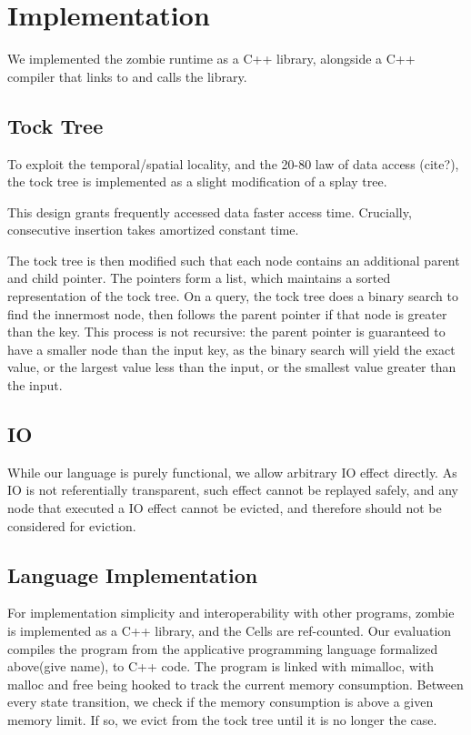 \section{Implementation}
We implemented the zombie runtime as a C++ library, alongside a C++ compiler that links to and calls the library.
\subsection{Tock Tree}
To exploit the temporal/spatial locality, and the 20-80 law of data access (cite?), the tock tree is implemented as a slight modification of a splay tree.

This design grants frequently accessed data faster access time. Crucially, consecutive insertion takes amortized constant time.

The tock tree is then modified such that each node contains an additional parent and child pointer. The pointers form a list, which maintains a sorted representation of the tock tree. On a query, the tock tree does a binary search to find the innermost node, then follows the parent pointer if that node is greater than the key. This process is not recursive: the parent pointer is guaranteed to have a smaller node than the input key, as the binary search will yield the exact value, or the largest value less than the input, or the smallest value greater than the input.
\subsection{IO}
While our language is purely functional, we allow arbitrary IO effect directly. As IO is not referentially transparent, such effect cannot be replayed safely, and any node that executed a IO effect cannot be evicted, and therefore should not be considered for eviction.
\subsection{Language Implementation}
For implementation simplicity and interoperability with other programs, zombie is implemented as a C++ library, and the Cells are ref-counted. Our evaluation compiles the program from the applicative programming language formalized above(give name), to C++ code. The program is linked with mimalloc, with malloc and free being hooked to track the current memory consumption. Between every state transition, we check if the memory consumption is above a given memory limit. If so, we evict from the tock tree until it is no longer the case.
